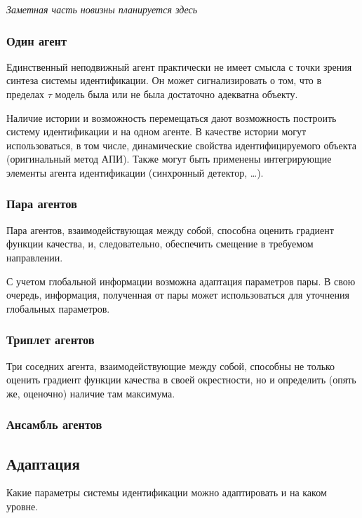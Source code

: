 \documentclass[a4paper,12pt]{article}
\begin{document}
\textit{ Заметная часть новизны планируется здесь}

\subsubsection{Один агент}

Единственный неподвижный агент практически не имеет смысла
с точки зрения синтеза системы идентификации.
Он может сигнализировать о том, что в пределах
\(\tau\) модель была или не была достаточно адекватна
объекту.

Наличие истории и возможность перемещаться дают возможность
построить систему идентификации и на одном агенте.
В качестве истории могут использоваться, в том числе,
динамические свойства идентифицируемого объекта
(оригинальный метод АПИ). Также могут быть
применены интегрирующие элементы агента идентификации
(синхронный детектор, \ldots).

\subsubsection{Пара агентов}

Пара агентов, взаимодействующая между собой,
способна оценить градиент функции качества,
и, следовательно, обеспечить смещение в требуемом направлении.

С учетом глобальной информации возможна адаптация параметров пары.
В свою очередь, информация, полученная от пары может
использоваться для уточнения глобальных параметров.

\subsubsection{Триплет агентов}

Три соседних агента, взаимодействующие между собой,
способны не только оценить градиент функции качества в своей окрестности,
но и определить (опять же, оценочно) наличие там максимума.

\subsubsection{Ансамбль агентов}

\subsection{Адаптация}

Какие параметры системы идентификации можно адаптировать
и на каком уровне.
\end{document}
